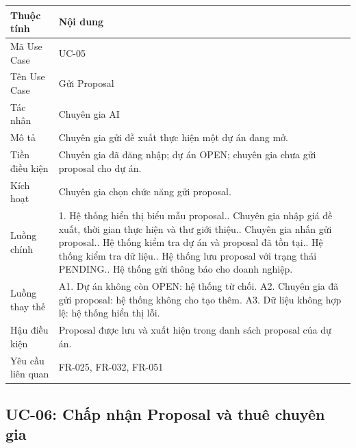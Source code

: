 \begin{longtable}{|p{3.5cm}|p{10.2cm}|}
\hline
\textbf{Thuộc tính} & \textbf{Nội dung} \\ \hline
Mã Use Case & UC-05 \\ \hline
Tên Use Case & Gửi Proposal \\ \hline
Tác nhân & Chuyên gia AI \\ \hline
Mô tả & Chuyên gia gửi đề xuất thực hiện một dự án đang mở. \\ \hline
Tiền điều kiện & Chuyên gia đã đăng nhập; dự án OPEN; chuyên gia chưa gửi proposal cho dự án. \\ \hline
Kích hoạt & Chuyên gia chọn chức năng gửi proposal. \\ \hline
Luồng chính &
1. Hệ thống hiển thị biểu mẫu proposal.\newline
2. Chuyên gia nhập giá đề xuất, thời gian thực hiện và thư giới thiệu.\newline
3. Chuyên gia nhấn gửi proposal.\newline
4. Hệ thống kiểm tra dự án và proposal đã tồn tại.\newline
5. Hệ thống kiểm tra dữ liệu.\newline
6. Hệ thống lưu proposal với trạng thái PENDING.\newline
7. Hệ thống gửi thông báo cho doanh nghiệp. \\ \hline
Luồng thay thế &
A1. Dự án không còn OPEN: hệ thống từ chối.\newline
A2. Chuyên gia đã gửi proposal: hệ thống không cho tạo thêm.\newline
A3. Dữ liệu không hợp lệ: hệ thống hiển thị lỗi. \\ \hline
Hậu điều kiện & Proposal được lưu và xuất hiện trong danh sách proposal của dự án. \\ \hline
Yêu cầu liên quan & FR-025, FR-032, FR-051 \\ \hline
\end{longtable}

\subsection{UC-06: Chấp nhận Proposal và thuê chuyên gia}

